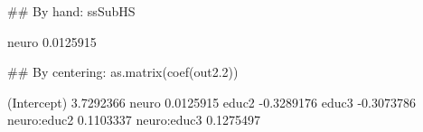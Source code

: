 \begin{Schunk}
\begin{Sinput}
 ## By hand:
 ssSubHS
\end{Sinput}
\begin{Soutput}
    neuro 
0.0125915 
\end{Soutput}
\begin{Sinput}
 ## By centering:
 as.matrix(coef(out2.2))
\end{Sinput}
\begin{Soutput}
                  [,1]
(Intercept)  3.7292366
neuro        0.0125915
educ2       -0.3289176
educ3       -0.3073786
neuro:educ2  0.1103337
neuro:educ3  0.1275497
\end{Soutput}
\end{Schunk}

